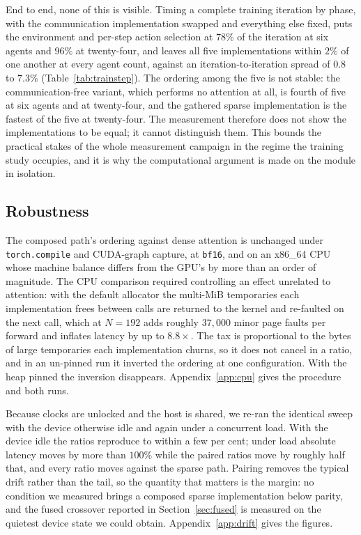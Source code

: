 End to end, none of this is visible. Timing a complete training iteration by
phase, with the communication implementation swapped and everything else fixed,
puts the environment and per-step action selection at $78\%$ of the iteration at
six agents and $96\%$ at twenty-four, and leaves all five implementations within
$2\%$ of one another at every agent count, against an iteration-to-iteration
spread of $0.8$ to $7.3\%$ (Table~\ref{tab:trainstep}). The ordering among the
five is not stable: the communication-free variant, which performs no
attention at all, is fourth of five at six agents and at
twenty-four, and the gathered sparse implementation is the fastest of the
five at twenty-four. The measurement therefore does not show the implementations to be
equal; it cannot distinguish them. This bounds the practical
stakes of the whole measurement campaign in the regime the training study
occupies, and it is why the computational argument is made on the module in
isolation.


\subsection{Robustness}
\label{sec:robustness}


The composed path's ordering against dense attention is unchanged under
\texttt{torch.compile} and CUDA-graph capture, at \texttt{bf16}, and on an x86\_64 CPU whose machine balance differs from the
GPU's by more than an order of magnitude. The CPU comparison required
controlling an effect unrelated to attention: with the default allocator the
multi-MiB temporaries each implementation frees between calls are returned to
the kernel and re-faulted on the next call, which at $N{=}192$ adds roughly
$37{,}000$ minor page faults per forward and inflates latency by up to
$8.8\times$. The tax is proportional to the bytes of large temporaries each
implementation churns, so it does not cancel in a ratio, and in an un-pinned run
it inverted the ordering at one configuration. With the heap pinned the
inversion disappears. Appendix~\ref{app:cpu} gives the procedure and both runs.

Because clocks are unlocked and the host is shared, we re-ran the identical
sweep with the device otherwise idle and again under a concurrent load. With the
device idle the ratios reproduce to within a few per cent; under load absolute
latency moves by more than $100\%$ while the paired ratios move by roughly half
that, and every ratio moves against the sparse path. Pairing removes the typical
drift rather than the tail, so the quantity that matters is the margin: no
condition we measured brings a composed sparse implementation below parity, and
the fused crossover reported in Section~\ref{sec:fused} is measured on the
quietest device state we could obtain. Appendix~\ref{app:drift} gives the
figures.


